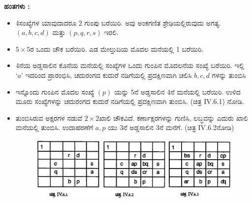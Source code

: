 \textbf{ಹಂತಗಳು :}
\begin{itemize}
	\item 4ಸಂಖ್ಯೆಗಳ ಯಾವುದಾದರೂ 2 ಗುಂಪು ಬರೆಯಿರಿ. ಅವು ಅಂಕಗಣಿತ ಶ್ರೇಢಿಯಲ್ಲಿರುವುದು ಅಗತ್ಯ. $(a, b, c, d)$ ಮತ್ತು $(p, q, r, s)$ ಇರಲಿ.
	\item $5 \times 5$ರ ಒಂದು ಚೌಕ ಬರೆಯಿರಿ. ಎಡ ಮೇಲ್ತುದಿಯ ಮೊದಲ ಮನೆಯಲ್ಲಿ 1 ಬರೆಯಿರಿ.
	\item 4ನೆಯ ಅಡ್ಡಸಾಲಿನ ಕೊನೆಯ ಮನೆಯಲ್ಲಿ ಸಂಖ್ಯೆಗಳ ಒಂದು ಗುಂಪಿನ ಮೊದಲನೆಯ ಸಂಖ್ಯೆ ಬರೆಯಿರಿ. ಇಲ್ಲಿ $‘a’$ ಇದರಿಂದ ಪ್ರಾರಂಭಿಸಿ, ಚದುರಂಗದ ಕುದುರೆ ನಡಿಗೆಯಲ್ಲಿ ಪ್ರದಕ್ಷಿಣವಾಗಿ ಚಲಿಸಿ $b, c, d$ ಗಳನ್ನು ತುಂಬಿಸಿ
	\item ಇನ್ನೊಂದು ಗುಂಪಿನ ಮೊದಲ ಸಂಖ್ಯೆ $(p)$ ಯನ್ನು 5ನೆ ಅಡ್ಡಸಾಲಿನ 4ನೆ ಮನೆಯಲ್ಲಿ ಬರೆಯಿರಿ. ಉಳಿದ ಮೂರು ಸಂಖ್ಯೆಗಳನ್ನು ಚದುರಂಗದ ಕುದುರೆ ನಡಿಗೆಯಲ್ಲಿ ಪ್ರದಕ್ಷಿಣವಾಗಿ ತುಂಬಿಸಿ. (ಚಿತ್ರ IV.6.1) ನೋಡಿ.
	\item ತುಂಬಿಸಿರುವ ಅಕ್ಷರಗಳ ನಡುವೆ $2 \times 2$ಖಾಲಿ ಚೌಕವಿದೆ. ಕರ್ಣಾಕ್ಷರಗಳನ್ನು \hbox{ಗುಣಿಸಿ,} ಲಬ್ಧವನ್ನು ಎದುರು ಖಾಲಿ ಮನೆಯಲ್ಲಿ ತುಂಬಿಸಿ. ಉದಾಹರಣೆಗೆ $a, p$ ಯು  3ನೆ ಅಡ್ಡಸಾಲಿನ 3ನೆ ಮನೆಗೆ. (ಚಿತ್ರ IV.6.2ನೋಡಿ)
	\begin{figure}[H]
	\includegraphics[scale=.8]{src/figures/chap7/fig7-28.jpg}
	\end{figure}


\end{itemize}
